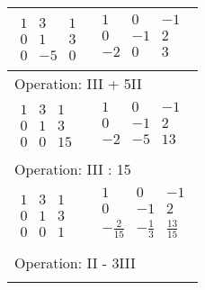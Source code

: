 \begin{longtable}{p{4cm}|p{3cm}}
    $\displaystyle\begin{matrix}
                          1 & 3  & 1 \\
                          0 & 1  & 3 \\
                          0 & -5 & 0
                      \end{matrix}$         &
    $\displaystyle\begin{matrix}
                          1  & 0  & -1 \\
                          0  & -1 & 2  \\
                          -2 & 0  & 3  \\
                      \end{matrix}$                                                            \\\hline
    \multicolumn{2}{p{\dimexpr4cm+3cm+2\tabcolsep\relax}}{Operation: III + 5II}            \\\hline\pagebreak[0]

    $\displaystyle\begin{matrix}
                          1 & 3 & 1  \\
                          0 & 1 & 3  \\
                          0 & 0 & 15
                      \end{matrix}$         &
    $\displaystyle\begin{matrix}
                          1  & 0  & -1 \\
                          0  & -1 & 2  \\
                          -2 & -5 & 13 \\
                      \end{matrix}$                                                            \\\hline
    \multicolumn{2}{p{\dimexpr4cm+3cm+2\tabcolsep\relax}}{Operation: III : 15}             \\\hline\pagebreak[0]

    $\displaystyle\begin{matrix}
                          1 & 3 & 1 \\
                          0 & 1 & 3 \\
                          0 & 0 & 1
                      \end{matrix}$         &
    $\displaystyle\begin{matrix}
                          1             & 0            & -1            \\
                          0             & -1           & 2             \\
                          -\frac{2}{15} & -\frac{1}{3} & \frac{13}{15} \\
                      \end{matrix}$                             \\\hline
    \multicolumn{2}{p{\dimexpr4cm+3cm+2\tabcolsep\relax}}{Operation: II - 3III}            \\\hline\pagebreak[0]


\end{longtable}
